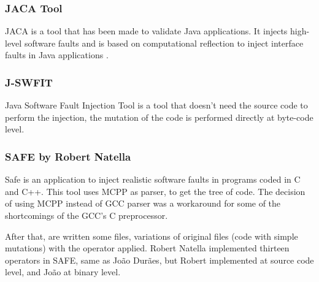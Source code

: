 \subsubsection{JACA Tool}
\hypertarget{JACA Tool}{}

JACA\cite{regina2003jaca} is a tool that has been made to validate Java applications. It injects high-level software faults and is based on computational reflection to inject interface faults in Java applications
\cite{martins2002jaca}. \\

\subsubsection{J-SWFIT}
\hypertarget{J-SWFIT}{}

Java Software Fault Injection Tool\cite{sanches2011j} is a tool that doesn't need the source code to perform the injection, the mutation of the code is performed directly at byte-code level.\\

\subsubsection{SAFE by Robert Natella}
\hypertarget{SAFE by Robert Natella}{}

Safe is an application to inject realistic software faults in programs coded in C and C++.
This tool uses MCPP as parser, to get the tree of code. The decision of using MCPP instead of GCC parser was a workaround for some of the shortcomings of the GCC's C preprocessor.

After that, are written some files, variations of original files (code with simple mutations) with the operator applied.
Robert Natella implemented thirteen operators in SAFE, same as João Durães\cite{duraes2006emulation}, but Robert implemented at source code level, and João at binary level.\\



